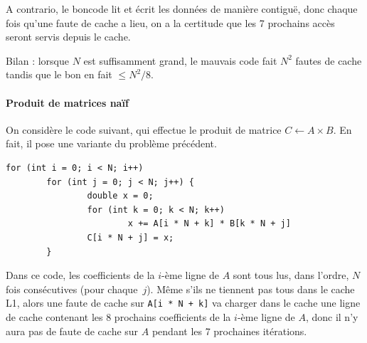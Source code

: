 A contrario, le \og bon\fg code lit et écrit les données de manière contiguë,
donc chaque fois qu'une faute de cache a lieu, on a la certitude que les 7
prochains accès seront servis depuis le cache.

Bilan : lorsque $N$ est suffisamment grand, le mauvais code fait $N^2$ fautes de
cache tandis que le bon en fait $\leq N^2 / 8$.

\paragraph{Produit de matrices naïf}

On considère le code suivant, qui effectue le produit de matrice
$C \gets A\times B$. En fait, il pose une variante du problème précédent.
\begin{verbatim}
for (int i = 0; i < N; i++)
        for (int j = 0; j < N; j++) {
                double x = 0;
                for (int k = 0; k < N; k++)
                        x += A[i * N + k] * B[k * N + j]
                C[i * N + j] = x;
        }
\end{verbatim}


Dans ce code, les coefficients de la $i$-ème ligne de $A$ sont tous lus, dans
l'ordre, $N$ fois consécutives (pour chaque~$j$). Même s'ils ne tiennent pas
tous dans le cache L1, alors une faute de cache sur \texttt{A[i * N + k]}
va charger dans le cache une ligne de cache contenant les 8 prochains
coefficients de la $i$-ème ligne de $A$, donc il n'y aura pas de faute de cache
sur $A$ pendant les 7 prochaines itérations.

